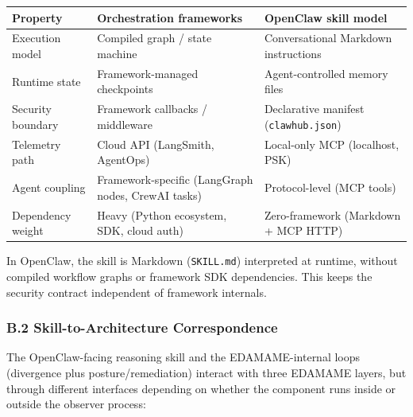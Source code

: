 \documentclass[
]{article}
\newcounter{none} %
\begin{document}
{\def\LTcaptype{none} %
\begin{longtable}[]{@{}
  >{\raggedright\arraybackslash}p{}
  >{\raggedright\arraybackslash}p{}
  >{\raggedright\arraybackslash}p{}@{}}
\toprule\noalign{}
\begin{minipage}[b]{\linewidth}\raggedright
Property
\end{minipage} & \begin{minipage}[b]{\linewidth}\raggedright
Orchestration frameworks
\end{minipage} & \begin{minipage}[b]{\linewidth}\raggedright
OpenClaw skill model
\end{minipage} \\
\midrule\noalign{}
\endhead
\bottomrule\noalign{}
\endlastfoot
Execution model & Compiled graph / state machine & Conversational
Markdown instructions \\
Runtime state & Framework-managed checkpoints & Agent-controlled memory
files \\
Security boundary & Framework callbacks / middleware & Declarative
manifest (\texttt{clawhub.json}) \\
Telemetry path & Cloud API (LangSmith, AgentOps) & Local-only MCP
(localhost, PSK) \\
Agent coupling & Framework-specific (LangGraph nodes, CrewAI tasks) &
Protocol-level (MCP tools) \\
Dependency weight & Heavy (Python ecosystem, SDK, cloud auth) &
Zero-framework (Markdown + MCP HTTP) \\
\end{longtable}
}

In OpenClaw, the skill is Markdown (\texttt{SKILL.md}) interpreted at
runtime, without compiled workflow graphs or framework SDK dependencies.
This keeps the security contract independent of framework internals.

\subsubsection{B.2 Skill-to-Architecture
Correspondence}\label{b.2-skill-to-architecture-correspondence}

The OpenClaw-facing reasoning skill and the EDAMAME-internal loops
(divergence plus posture/remediation) interact with three EDAMAME
layers, but through different interfaces depending on whether the
component runs inside or outside the observer process:
\end{document}
